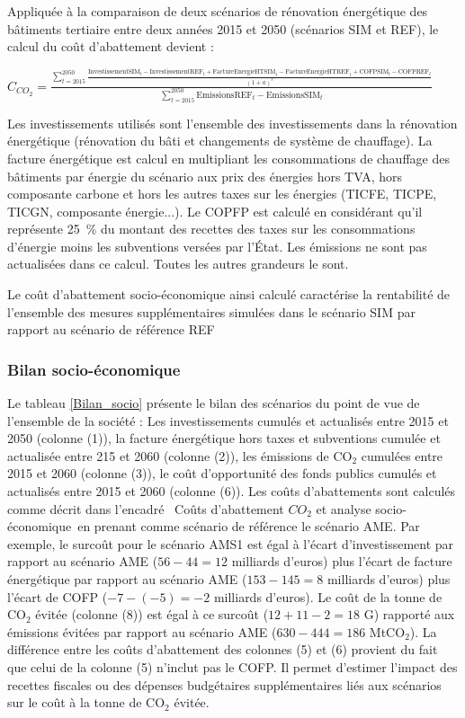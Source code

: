 \documentclass[10.5pt,a4paper]{article}
\def\euro{\mbox{\raisebox{.25ex}{{\it =}}\hspace{-.5em}{\sf C}}}
\begin{document}
{{{Appliquée à la comparaison de deux scénarios de rénovation énergétique des bâtiments tertiaire entre deux années 2015 et 2050 (scénarios SIM et REF), le calcul du coût d'abattement devient : 

$C_{CO_2} = \frac{
\sum_{t=2015}^{2050} \frac{\textrm{InvestissementSIM}_t -\textrm{InvestissementREF}_t  + \textrm{FactureEnergieHTSIM}_t - \textrm{FactureEnergieHTREF}_t + \textrm{COFPSIM}_t - \textrm{COFPREF}_t}{(1+a)^t}}{\sum_{t=2015}^{2050} \textrm{EmissionsREF}_t-\textrm{EmissionsSIM}_t} $ 

Les investissements utilisés sont l'ensemble des investissements dans la rénovation énergétique (rénovation du bâti et changements de système de chauffage). La facture énergétique est calcul en multipliant les consommations de chauffage des bâtiments par énergie du scénario aux prix des énergies hors TVA, hors composante carbone et hors les autres taxes sur les énergies (TICFE, TICPE, TICGN, composante énergie...).  Le COPFP est calculé en considérant qu'il représente 25~\% du montant des recettes des taxes sur les consommations d'énergie moins les subventions versées par l’État. Les émissions ne sont pas actualisées dans ce calcul. Toutes les autres grandeurs le sont.

Le coût d'abattement socio-économique ainsi calculé caractérise la rentabilité de l'ensemble des mesures supplémentaires simulées dans le scénario SIM par rapport au scénario de référence REF

}}
\newpage 

\subsubsection{Bilan socio-économique}

Le tableau \ref{Bilan_socio} présente le bilan des scénarios du point de vue de l'ensemble de la société : Les investissements cumulés et actualisés entre 2015 et 2050 (colonne (1)), la facture énergétique hors taxes et subventions cumulée et actualisée entre 215 et 2060 (colonne (2)), les émissions de CO$_2$ cumulées entre 2015 et 2060 (colonne (3)), le coût d'opportunité des fonds publics cumulés et actualisés entre 2015 et 2060 (colonne (6)). Les coûts d'abattements sont calculés comme décrit dans l'encadré \og~Coûts d’abattement $CO_2$ et analyse socio-économique~\fg en prenant comme scénario de référence le scénario AME. Par exemple, le surcoût pour le scénario AMS1 est égal à l'écart d'investissement par rapport au scénario AME ($56 - 44 = 12$ milliards d'euros) plus l'écart de facture énergétique par rapport au scénario AME ($153 - 145 = 8$ milliards d'euros) plus l'écart de COFP ($-7 - (-5) = -2$ milliards d'euros). Le coût de la tonne de CO$_2$ évitée (colonne (8)) est égal à ce surcoût ($12+11-2= 18$ G\euro)  rapporté aux émissions évitées par rapport au scénario AME ($630 - 444 = 186$ MtCO$_2$). La différence entre les coûts d'abattement des colonnes (5) et (6) provient du fait que celui de la colonne (5) n'inclut pas le COFP. Il permet d'estimer l'impact des recettes fiscales ou des dépenses budgétaires supplémentaires liés aux scénarios sur le coût à la tonne de CO$_2$ évitée. 

}
\end{document}
